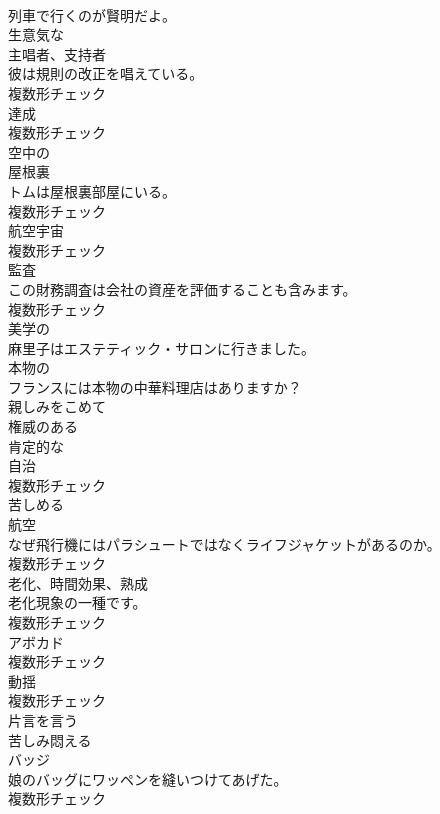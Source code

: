 \documentclass[8pt]{extreport}
\begin{document}
\begin{CJK}{UTF8}{min}
\\	列車で行くのが賢明だよ。	
\\	[形容詞]	生意気な	
\\	[名詞]	主唱者、支持者	
\\	彼は規則の改正を唱えている。	
\\	複数形チェック
\\	[名詞]	達成	
\\	複数形チェック
\\	[形容詞]	空中の	
\\	[名詞]	屋根裏	
\\	トムは屋根裏部屋にいる。	
\\	複数形チェック
\\	[名詞]	航空宇宙	
\\	複数形チェック
\\	[名詞]	監査	
\\	この財務調査は会社の資産を評価することも含みます。	
\\	複数形チェック
\\	[形容詞]	美学の	
\\	麻里子はエステティック・サロンに行きました。	
\\	[形容詞]	本物の	
\\	フランスには本物の中華料理店はありますか？	
\\	[副詞]	親しみをこめて	
\\	[形容詞]	権威のある	
\\	[形容詞]	肯定的な	
\\	[名詞]	自治	
\\	複数形チェック
\\	[動詞]	苦しめる	
\\	[名詞]	航空	
\\	なぜ飛行機にはパラシュートではなくライフジャケットがあるのか。	
\\	複数形チェック
\\	[名詞]	老化、時間効果、熟成	
\\	老化現象の一種です。	
\\	複数形チェック
\\	[名詞]	アボカド	
\\	複数形チェック
\\	[名詞]	動揺	
\\	複数形チェック
\\	[動詞]	片言を言う	
\\	[動詞]	苦しみ悶える	
\\	[名詞]	バッジ	
\\	娘のバッグにワッペンを縫いつけてあげた。	
\\	複数形チェック

\end{CJK}
\end{document}

